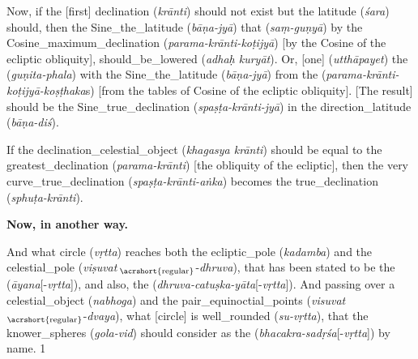 \clearpage{}

\noindent\reversemarginpar{}%
Now, if the [first] \gls{declination} (\textit{krānti}) should not exist but the \gls{latitude} (\textit{śara}) should, then the \gls{Sine_the_latitude} (\textit{bāṇa-jyā}) that
 (\textit{saṃ-guṇyā}) by the \gls{Cosine_maximum_declination} (\textit{parama-krānti-koṭijyā}) [\ie by the Cosine of the ecliptic obliquity], \gls{should_be_lowered} (\textit{adhaḥ kuryāt}). Or, [one]  (\textit{utthāpayet}) the  (\textit{guṇita-phala}) with the \gls{Sine_the_latitude} (\textit{bāṇa-jyā}) from the  (\textit{parama-krānti-koṭijyā-koṣṭhaka}s) [\ie from the tables of Cosine of the ecliptic obliquity]. [The result] should be the \gls{Sine_true_declination} (\textit{spaṣṭa-krānti-jyā}) in the \gls{direction_latitude} (\textit{bāṇa-diś}). \label{passge_6_sara_glossary_format_example}
\medskip

\noindent\reversemarginpar{}%
If the \gls{declination_celestial_object} (\textit{khagasya krānti}) should be equal to the \gls{greatest_declination} (\textit{parama-krānti}) [\ie the obliquity of the ecliptic], then the very \gls{curve_true_declination} (\textit{spa\-ṣṭa-krānti-aṅka}) becomes the \gls{true_declination} (\textit{sphuṭa-krānti}).
\bigskip

\textbf{Now, in another way.}
\bigskip

\noindent\reversemarginpar{}%
And what \gls{circle} (\textit{vṛtta}) reaches both the \gls{ecliptic_pole} (\textit{kadamba}) and the \gls{celestial_pole} (\textit{viṣuvat}\,$_\text{\acrshort{regular}}$-\textit{dhruva}), that has been stated to be the  (\textit{āyana}[-\textit{vṛtta}]), and also, the  (\textit{dhruva-catuṣka-yāta}[-\textit{vṛtta}]). And passing over a \gls{celestial_object} (\textit{nabhoga}) and the \gls{pair_equinoctial_points} (\textit{visuvat}\,$_\text{\acrshort{regular}}$-\textit{dvaya}), what [circle] is \gls{well_rounded} (\textit{su-vṛtta}), that the \gls{knower_spheres} (\textit{gola-vid}) should consider as
the  (\textit{bhacakra-sadṛśa}[-\textit{vṛtta}]) by name. 1 
\label{verse_1_label_eng_example}


